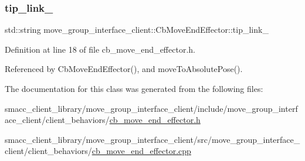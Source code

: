 \subsubsection{\texorpdfstring{tip\+\_\+link\+\_\+}{tip\_link\_}}
{\footnotesize\ttfamily std\+::string move\+\_\+group\+\_\+interface\+\_\+client\+::\+Cb\+Move\+End\+Effector\+::tip\+\_\+link\+\_\+}



Definition at line 18 of file cb\+\_\+move\+\_\+end\+\_\+effector.\+h.



Referenced by Cb\+Move\+End\+Effector(), and move\+To\+Absolute\+Pose().



The documentation for this class was generated from the following files\+:\begin{DoxyCompactItemize}
\item 
smacc\+\_\+client\+\_\+library/move\+\_\+group\+\_\+interface\+\_\+client/include/move\+\_\+group\+\_\+interface\+\_\+client/client\+\_\+behaviors/\hyperlink{cb__move__end__effector_8h}{cb\+\_\+move\+\_\+end\+\_\+effector.\+h}\item 
smacc\+\_\+client\+\_\+library/move\+\_\+group\+\_\+interface\+\_\+client/src/move\+\_\+group\+\_\+interface\+\_\+client/client\+\_\+behaviors/\hyperlink{cb__move__end__effector_8cpp}{cb\+\_\+move\+\_\+end\+\_\+effector.\+cpp}\end{DoxyCompactItemize}
